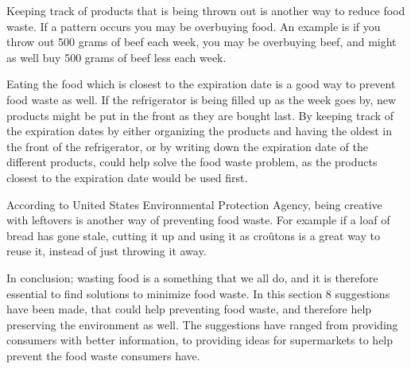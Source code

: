 Keeping track of products that is being thrown out is another way to reduce food waste. If a pattern occurs you may be overbuying food. An example is if you throw out 500 grams of beef each week, you may be overbuying beef, and might as well buy 500 grams of beef less each week\cite{madSpild_Greatist}.

Eating the food which is closest to the expiration date is a good way to prevent food waste as well. If the refrigerator is being filled up as the week goes by, new products might be put in the front as they are bought last. By keeping track of the expiration dates by either organizing the products and having the oldest in the front of the refrigerator, or by writing down the expiration date of the different products, could help solve the food waste problem, as the products closest to the expiration date would be used first. 

According to United States Environmental Protection Agency\cite{madSpild_EPA}, being creative with leftovers is another way of preventing food waste. For example if a loaf of bread has gone stale, cutting it up and using it as croûtons is a great way to reuse it, instead of just throwing it away.

In conclusion; wasting food is a something that we all do, and it is therefore essential to find solutions to minimize food waste. In this section 8 suggestions have been made, that could help preventing food waste, and therefore help preserving the environment as well. The suggestions have ranged from providing consumers with better information, to providing ideas for supermarkets to help prevent the food waste consumers have.